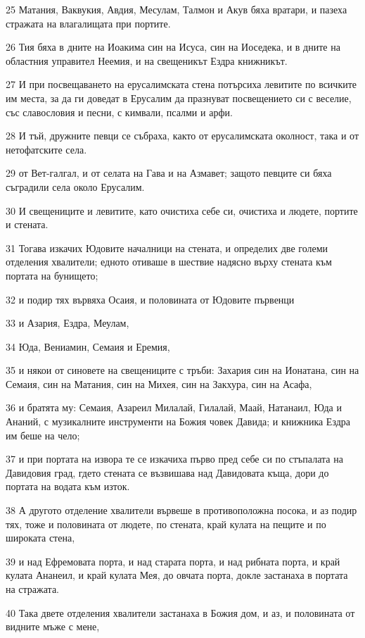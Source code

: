 \par 25 Матания, Ваквукия, Авдия, Месулам, Талмон и Акув бяха вратари, и пазеха стражата на влагалищата при портите.
\par 26 Тия бяха в дните на Иоакима син на Исуса, син на Иоседека, и в дните на областния управител Неемия, и на свещеникът Ездра книжникът.
\par 27 И при посвещаването на ерусалимската стена потърсиха левитите по всичките им места, за да ги доведат в Ерусалим да празнуват посвещението си с веселие, със славословия и песни, с кимвали, псалми и арфи.
\par 28 И тъй, дружните певци се събраха, както от ерусалимската околност, така и от нетофатските села.
\par 29 от Вет-галгал, и от селата на Гава и на Азмавет; защото певците си бяха съградили села около Ерусалим.
\par 30 И свещениците и левитите, като очистиха себе си, очистиха и людете, портите и стената.
\par 31 Тогава изкачих Юдовите началници на стената, и определих две големи отделения хвалители; едното отиваше в шествие надясно върху стената към портата на бунището;
\par 32 и подир тях вървяха Осаия, и половината от Юдовите първенци
\par 33 и Азария, Ездра, Меулам,
\par 34 Юда, Вениамин, Семаия и Еремия,
\par 35 и някои от синовете на свещениците с тръби: Захария син на Ионатана, син на Семаия, син на Матания, син на Михея, син на Закхура, син на Асафа,
\par 36 и братята му: Семаия, Азареил Милалай, Гилалай, Маай, Натанаил, Юда и Ананий, с музикалните инструменти на Божия човек Давида; и книжника Ездра им беше на чело;
\par 37 и при портата на извора те се изкачиха първо пред себе си по стъпалата на Давидовия град, гдето стената се възвишава над Давидовата къща, дори до портата на водата към изток.
\par 38 А другото отделение хвалители вървеше в противоположна посока, и аз подир тях, тоже и половината от людете, по стената, край кулата на пещите и по широката стена,
\par 39 и над Ефремовата порта, и над старата порта, и над рибната порта, и край кулата Ананеил, и край кулата Мея, до овчата порта, докле застанаха в портата на стражата.
\par 40 Така двете отделения хвалители застанаха в Божия дом, и аз, и половината от видните мъже с мене,
